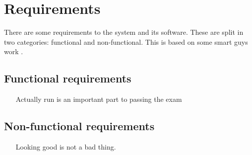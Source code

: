 \section{Requirements}
There are some requirements to the system and its software. These are split in two categories: functional and non-functional. This is based on some smart guys work \cite[citation needed]{keylist}.

\subsection{Functional requirements}

\begin{itemize}
	\item[Actually run] is an important part to passing the exam
\end{itemize}

\subsection{Non-functional requirements}

\begin{itemize}
	\item[Looking good] is not a bad thing.
\end{itemize}